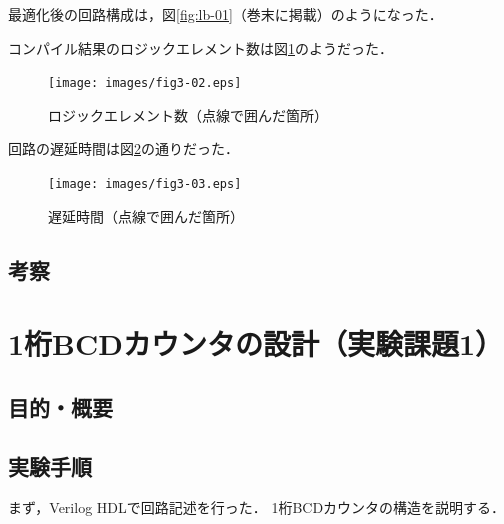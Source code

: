 \documentclass[uplatex]{jsarticle}
\begin{document}
最適化後の回路構成は，図\ref{fig:lb-01}（巻末に掲載）のようになった．

コンパイル結果のロジックエレメント数は図\ref{fig:3-02}のようだった． 

\begin{figure}[htb]
  \begin{center}
    \texttt{[image: images/fig3-02.eps]}
    \caption{ロジックエレメント数（点線で囲んだ箇所）}
    \label{fig:3-02}
  \end{center}
\end{figure}

回路の遅延時間は図\ref{fig:3-03}の通りだった．

\begin{figure}[htb]
  \begin{center}
    \texttt{[image: images/fig3-03.eps]}
    \caption{遅延時間（点線で囲んだ箇所）}
    \label{fig:3-03}
  \end{center}
\end{figure}

\subsection{考察}



\clearpage

\section{1桁BCDカウンタの設計（実験課題1）}

\subsection{目的・概要}

\subsection{実験手順}

まず，Verilog HDLで回路記述を行った．
1桁BCDカウンタの構造を説明する．
\end{document}
